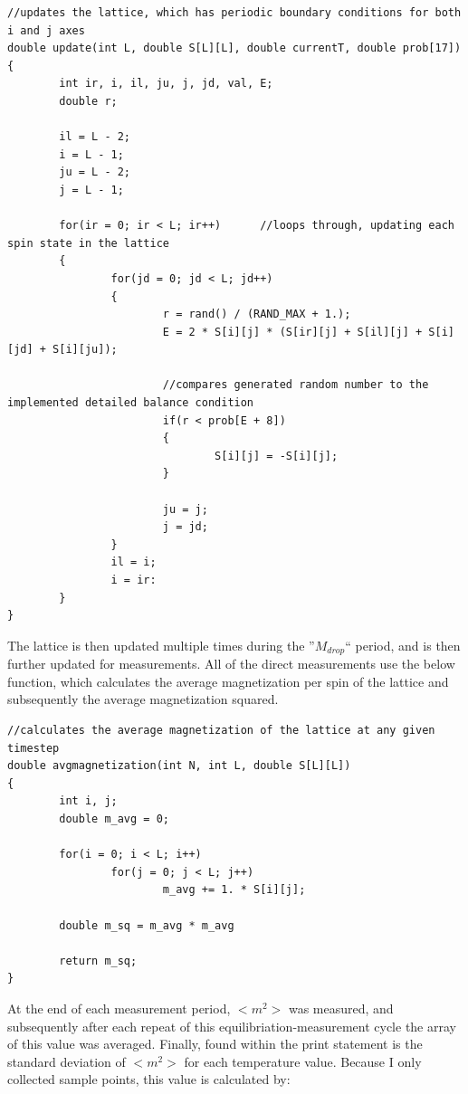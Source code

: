 \documentclass[10pt]{article}
\begin{document}
\begin{verbatim}
//updates the lattice, which has periodic boundary conditions for both i and j axes
double update(int L, double S[L][L], double currentT, double prob[17])
{
        int ir, i, il, ju, j, jd, val, E;
        double r;
        
        il = L - 2;
        i = L - 1;
        ju = L - 2;
        j = L - 1;
        
        for(ir = 0; ir < L; ir++)      //loops through, updating each spin state in the lattice
        {
                for(jd = 0; jd < L; jd++)
                {
                        r = rand() / (RAND_MAX + 1.);
                        E = 2 * S[i][j] * (S[ir][j] + S[il][j] + S[i][jd] + S[i][ju]);
                        
                        //compares generated random number to the implemented detailed balance condition
                        if(r < prob[E + 8])
                        {
                                S[i][j] = -S[i][j];
                        }
                        
                        ju = j;
                        j = jd;
                }
                il = i;
                i = ir:
        }
}
\end{verbatim}

The lattice is then updated multiple times during the ''$M_{drop}$`` period, and is then further updated for measurements. All of the direct measurements use the below function, which calculates the average magnetization per spin of the lattice and subsequently the average magnetization squared.

\begin{verbatim}
//calculates the average magnetization of the lattice at any given timestep
double avgmagnetization(int N, int L, double S[L][L]) 
{
        int i, j;
        double m_avg = 0;
        
        for(i = 0; i < L; i++)
                for(j = 0; j < L; j++)
                        m_avg += 1. * S[i][j];
                        
        double m_sq = m_avg * m_avg
       
        return m_sq; 
}
\end{verbatim}
At the end of each measurement period, $<m^2>$ was measured, and subsequently after each repeat of this equilibriation-measurement cycle the array of this value was averaged. Finally, found within the print statement is the standard deviation of $<m^2>$ for each temperature value. Because I only collected sample points, this value is calculated by: 
\end{document}
